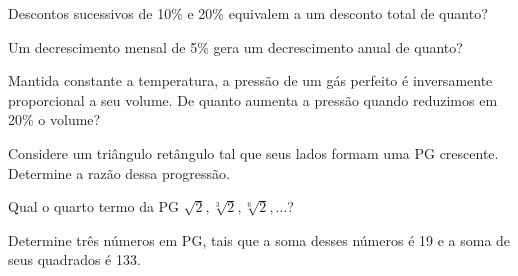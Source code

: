 
\begin{exercise}
    Descontos sucessivos de 10\% e 20\% equivalem a um desconto
total de quanto?
\end{exercise}



\begin{exercise}
    Um decrescimento mensal de 5\% gera um decrescimento anual de
quanto?
\end{exercise}


\begin{exercise}
    Mantida constante a temperatura, a pressão de um gás perfeito é
inversamente proporcional a seu volume. De quanto aumenta a pressão
quando reduzimos em 20\% o volume?
\end{exercise}



\begin{exercise}
    Considere um triângulo retângulo tal que seus lados formam uma
PG crescente. Determine a razão dessa progressão.
\end{exercise}

\begin{exercise}
    Qual o quarto termo da PG $\sqrt 2 , \sqrt[3] 2 , \sqrt[6] 2 ,
\dots$?
\end{exercise}

\begin{exercise}
    Determine três números em PG, tais que a soma desses números é
19 e a soma de seus quadrados é 133.
\end{exercise}

